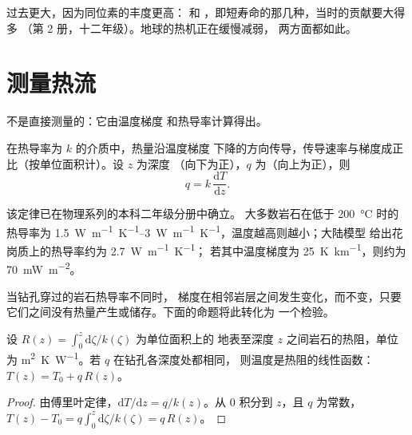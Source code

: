 过去更大，因为同位素的丰度更高：
 和 ，即短寿命的那几种，当时的贡献要大得多
（第 2 册，十二年级）。地球的热机正在缓慢减弱，
两方面都如此。

\section{测量热流}

不是直接测量的：它由温度梯度
和热导率计算得出。

\begin{proposition}[傅里叶定律]\label{prop:b1:heat-budget:fourier}
在热导率为 $k$ 的介质中，热量沿温度梯度
下降的方向传导，传导速率与梯度成正比（按单位面积计）。设 $z$ 为深度
（向下为正），$q$ 为（向上为正），则
\[
  q = k\,\frac{\mathrm dT}{\mathrm dz} .
\]
\end{proposition}
\admitted

该定律已在物理系列的本科二年级分册中确立。
大多数岩石在低于
\qty{200}{\celsius} 时的热导率为 \qtyrange{1.5}{3}{W.m^{-1}.K^{-1}}，温度越高则越小；大陆模型
给出花岗质上的热导率约为 \qty{2.7}{W.m^{-1}.K^{-1}}；
若其中温度梯度为 \qty{25}{K.km^{-1}}，则约为
\qty{70}{mW.m^{-2}}。

当钻孔穿过的岩石热导率不同时，
梯度在相邻岩层之间发生变化，而不变，只要
它们之间没有热量产生或储存。下面的命题将此转化为
一个检验。

\begin{proposition}[布拉德图]\label{prop:b1:heat-budget:bullard}
设 $R(z) = \int_0^z \mathrm d\zeta/k(\zeta)$ 为单位面积上的
地表至深度 $z$ 之间岩石的热阻，单位为
\unit{m^2.K.W^{-1}}。若 $q$ 在钻孔各深度处都相同，
则温度是热阻的线性函数：
$T(z) = T_0 + q\,R(z)$。
\end{proposition}

\begin{proof}
由傅里叶定律，$\mathrm dT/\mathrm dz = q/k(z)$。从 $0$ 积分到
$z$，且 $q$ 为常数，$T(z) - T_0 = q\int_0^z \mathrm d\zeta/k(\zeta) = q\,R(z)$。
\end{proof}

